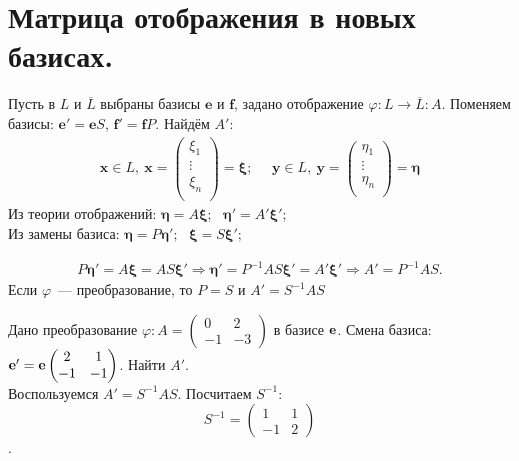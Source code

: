  \section{Матрица отображения в новых базисах.}
Пусть в $L$ и $\overline L$ выбраны базисы $\textbf{e}$ и $\textbf{f}$, задано отображение $\varphi\colon L \to \overline L: A$.
Поменяем базисы: $ \textbf{e}' = \textbf{e} S$, $ \textbf{f}' = \textbf{f} P$.
Найдём $A'$:\\
\begin{gather*}
\textbf{x} \in L,~ \textbf{x}=\left(\begin{smallmatrix}
\xi_1 \\ \vdots\\ \xi_n\\
\end{smallmatrix} \right)=\bm{\xi};~~~~~~
\textbf{y} \in L,~ \textbf{y}=\left(\begin{smallmatrix}
\eta_1 \\ \vdots\\ \eta_n\\
\end{smallmatrix} \right)=\bm{\eta}
\end{gather*}
Из теории отображений: $\bm{\eta} = A \bm{\xi};~~~\bm{\eta}' = A' \bm{\xi}';$\\
Из замены базиса: $	\bm{\eta} = P \bm{\eta}';~~~	\bm{\xi} = S \bm\xi';$

\begin{gather*}
	P \bm \eta' = A \bm \xi = AS \bm\xi'
\Rightarrow
	\bm\eta' = P^{-1} A S \bm\xi'=A' \bm \xi'
\Rightarrow
	\boxed{A' = P^{-1} A S.}
\end{gather*}
Если $\varphi$~--- преобразование, то $P=S$ и $A'=S^{-1}AS$\\

\begin{prim} 
	Дано преобразование $\varphi\colon A = \begin{pmatrix} 0 & 2 \\ -1 & -3 \end{pmatrix}$ в базисе $\bf e$. Смена базиса: $\bf e' = \bf e \begin{pmatrix} 2 & 1 \\ -1 & -1 \end{pmatrix}$.
Найти $A'$.\\

Воспользуемся $A'=S^{-1}AS$. Посчитаем $S^{-1}$:\\
$$S^{-1} =
\begin{pmatrix} 1 & 1 \\ -1 & 2 \end{pmatrix}$$.
\end{prim}
